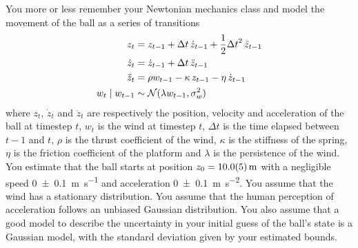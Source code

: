 \documentclass[11pt, a4paper]{exam}
\begin{document}
\begin{exercises}
You more or less remember your Newtonian mechanics class and model the movement of the ball as a series of transitions
\begin{align*}
    z_t & = z_{t-1} + \Delta t \, \dot{z}_{t-1} + \frac{1}{2} {\Delta t}^2 \, \ddot{z}_{t-1} \\
    \dot{z}_t & = \dot{z}_{t-1} + \Delta t \, \ddot{z}_{t-1} \\
    \ddot{z}_t & = \rho w_{t-1} - \kappa \, z_{t-1} - \eta \, \dot{z}_{t-1} \\
    w_t \mid w_{t-1} & \sim \mathcal{N}(\lambda w_{t-1}, \sigma_w^2)
\end{align*}
where $z_t$, $\dot{z}_t$ and $\ddot{z}_t$ are respectively the position, velocity and acceleration of the ball at timestep $t$, $w_t$ is the wind at timestep $t$, $\Delta t$ is the time elapsed between $t-1$ and $t$, $\rho$ is the thrust coefficient of the wind, $\kappa$ is the stiffness of the spring, $\eta$ is the friction coefficient of the platform and $\lambda$ is the persistence of the wind. You estimate that the ball starts at position $z_0 = \qty{10 \pm 0.5}{\meter}$ with a negligible speed \qty{0 \pm 0.1}{\meter\per\second} and acceleration \qty{0 \pm 0.1}{\meter\per\second\squared}. You assume that the wind has a stationary distribution. You assume that the human perception of acceleration follows an unbiased Gaussian distribution. You also assume that a good model to describe the uncertainty in your initial guess of the ball's state is a Gaussian model, with the standard deviation given by your estimated bounds.

\end{exercises}
\end{document}
